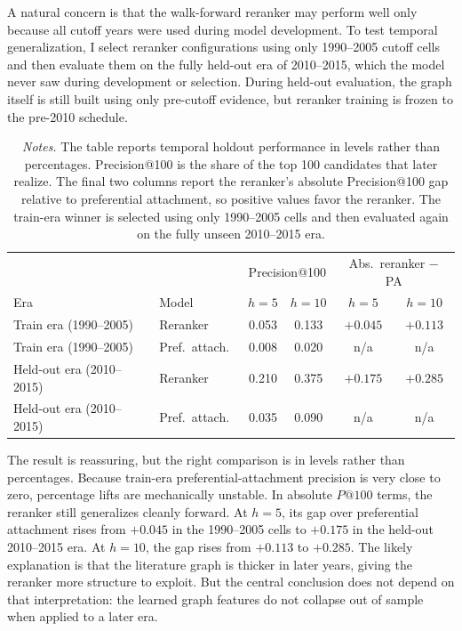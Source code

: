 \documentclass[11pt]{article}
\newcommand{\fignotes}[1]{\caption*{\textit{Notes.} #1}}
\begin{document}
A natural concern is that the walk-forward reranker may perform well only because all cutoff years were used during model development. To test temporal generalization, I select reranker configurations using only 1990--2005 cutoff cells and then evaluate them on the fully held-out era of 2010--2015, which the model never saw during development or selection. During held-out evaluation, the graph itself is still built using only pre-cutoff evidence, but reranker training is frozen to the pre-2010 schedule.

\begin{table}[h]
  \caption{Held-out temporal generalization}
  \label{tab:temporal-generalization}
  \centering
  \begin{tabular}{llcccc}
    \toprule
    & & \multicolumn{2}{c}{Precision@100} & \multicolumn{2}{c}{Abs.\ reranker $-$ PA} \\
    Era & Model & \(h=5\) & \(h=10\) & \(h=5\) & \(h=10\) \\
    \midrule
    Train era (1990--2005) & Reranker & 0.053 & 0.133 & $+0.045$ & $+0.113$ \\
    Train era (1990--2005) & Pref.\ attach.\ & 0.008 & 0.020 & n/a & n/a \\
    Held-out era (2010--2015) & Reranker & 0.210 & 0.375 & $+0.175$ & $+0.285$ \\
    Held-out era (2010--2015) & Pref.\ attach.\ & 0.035 & 0.090 & n/a & n/a \\
    \bottomrule
  \end{tabular}
  \fignotes{The table reports temporal holdout performance in levels rather than percentages. Precision@100 is the share of the top 100 candidates that later realize. The final two columns report the reranker's absolute Precision@100 gap relative to preferential attachment, so positive values favor the reranker. The train-era winner is selected using only 1990--2005 cells and then evaluated again on the fully unseen 2010--2015 era.}
\end{table}

The result is reassuring, but the right comparison is in levels rather than percentages. Because train-era preferential-attachment precision is very close to zero, percentage lifts are mechanically unstable. In absolute \(P@100\) terms, the reranker still generalizes cleanly forward. At \(h=5\), its gap over preferential attachment rises from \(+0.045\) in the 1990--2005 cells to \(+0.175\) in the held-out 2010--2015 era. At \(h=10\), the gap rises from \(+0.113\) to \(+0.285\). The likely explanation is that the literature graph is thicker in later years, giving the reranker more structure to exploit. But the central conclusion does not depend on that interpretation: the learned graph features do not collapse out of sample when applied to a later era.
\end{document}
